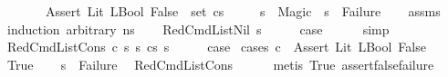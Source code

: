 \begin{isabellebody}
\ \ \ \ \ \ \ {\isachardoublequoteopen}{\isacharparenleft}{\kern0pt}Assert\ {\isacharparenleft}{\kern0pt}Lit\ {\isacharparenleft}{\kern0pt}LBool\ False{\isacharparenright}{\kern0pt}{\isacharparenright}{\kern0pt}{\isacharparenright}{\kern0pt}\ {\isasymin}\ set\ {\isacharparenleft}{\kern0pt}cs{\isacharparenright}{\kern0pt}{\isachardoublequoteclose}\isanewline
\ \ \ \ \ {\isachardoublequoteopen}s{\isacharprime}{\kern0pt}\ {\isacharequal}{\kern0pt}\ Magic\ {\isasymor}\ s{\isacharprime}{\kern0pt}\ {\isacharequal}{\kern0pt}\ Failure{\isachardoublequoteclose}\isanewline
%
\isadelimproof
\ \ %
\endisadelimproof
%
\isatagproof
{}\isamarkupfalse%
\ assms\isanewline
{}\isamarkupfalse%
\ {\isacharparenleft}{\kern0pt}induction\ arbitrary{\isacharcolon}{\kern0pt}\ ns{\isacharparenright}{\kern0pt}\isanewline
\ \ \isamarkupfalse%
\ {\isacharparenleft}{\kern0pt}RedCmdListNil\ s{\isacharparenright}{\kern0pt}\isanewline
\ \ \isamarkupfalse%
\ \isamarkupfalse%
\ {\isacharquery}{\kern0pt}case\isanewline
\ \ \ \ \isamarkupfalse%
\ simp\isanewline
{}\isamarkupfalse%
\isanewline
\ \ \isamarkupfalse%
\ {\isacharparenleft}{\kern0pt}RedCmdListCons\ c\ s\ s{\isacharprime}{\kern0pt}{\isacharprime}{\kern0pt}\ cs\ s{\isacharprime}{\kern0pt}{\isacharparenright}{\kern0pt}\isanewline
\ \ \isamarkupfalse%
\ \isamarkupfalse%
\ {\isacharquery}{\kern0pt}case\isanewline
{}\isamarkupfalse%
\ {\isacharparenleft}{\kern0pt}cases\ {\isachardoublequoteopen}c\ {\isacharequal}{\kern0pt}\ {\isacharparenleft}{\kern0pt}Assert\ {\isacharparenleft}{\kern0pt}Lit\ {\isacharparenleft}{\kern0pt}LBool\ False{\isacharparenright}{\kern0pt}{\isacharparenright}{\kern0pt}{\isacharparenright}{\kern0pt}{\isachardoublequoteclose}{\isacharparenright}{\kern0pt}\isanewline
\ \ \isamarkupfalse%
\ True\isanewline
\ \ \isamarkupfalse%
\ {\isachardoublequoteopen}s{\isacharprime}{\kern0pt}{\isacharprime}{\kern0pt}\ {\isacharequal}{\kern0pt}\ Failure{\isachardoublequoteclose}\ \isamarkupfalse%
\ RedCmdListCons\isanewline
\ \ \ \ \isamarkupfalse%
\ {\isacharparenleft}{\kern0pt}metis\ True\ assert{\isacharunderscore}{\kern0pt}false{\isacharunderscore}{\kern0pt}failure{\isacharparenright}{\kern0pt}\isanewline
\ \ \isanewline
\ \ \isamarkupfalse%
\ \isamarkupfalse%

\end{isabellebody}
